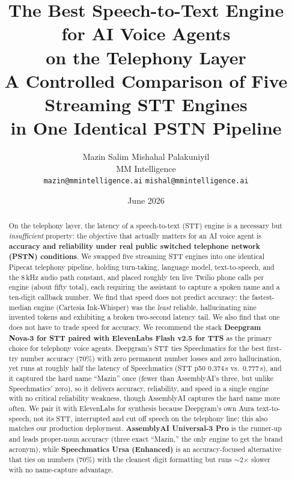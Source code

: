 \documentclass[11pt]{article}
\title{\textbf{The Best Speech-to-Text Engine for AI Voice Agents\\ on the Telephony Layer}\\[0.4em]
\large A Controlled Comparison of Five Streaming STT Engines\\ in One Identical PSTN Pipeline}
\author{%
  Mazin Salim \qquad Mishahal Palakuniyil\\[0.35em]
  \normalsize MM Intelligence\\
  \normalsize \texttt{mazin@mmintelligence.ai} \quad\textbullet\quad \texttt{mishal@mmintelligence.ai}%
}
\date{June 2026}
\begin{document}
\maketitle

\begin{abstract}
\noindent
On the telephony layer, the latency of a speech-to-text (STT) engine is a
necessary but \emph{insufficient} property: the objective that actually matters
for an AI voice agent is \textbf{accuracy and reliability under real public
switched telephone network (PSTN) conditions}. We swapped five streaming STT
engines into one identical Pipecat telephony pipeline, holding turn-taking,
language model, text-to-speech, and the 8\,kHz audio path constant, and placed
roughly ten live Twilio phone calls per engine (about fifty total), each
requiring the assistant to capture a spoken name and a ten-digit callback
number. We find that speed does not predict accuracy: the fastest-median engine
(Cartesia Ink-Whisper) was the \emph{least} reliable, hallucinating nine
invented tokens and exhibiting a broken two-second latency tail. We also find
that one does not have to trade speed for accuracy. We recommend the stack
\textbf{Deepgram Nova-3 for STT paired with ElevenLabs Flash v2.5 for TTS} as
the primary choice for telephony voice agents. Deepgram's STT ties Speechmatics
for the best first-try number accuracy (70\%) with zero permanent number losses
and zero hallucination, yet runs at roughly half the latency of Speechmatics
(STT p50 0.374\,s vs.\ 0.777\,s), and it captured the hard name ``Mazin'' once
(fewer than AssemblyAI's three, but unlike Speechmatics' zero), so it delivers
accuracy, reliability, and speed in a single engine with no critical reliability
weakness, though AssemblyAI captures the hard name more often. We pair it with
ElevenLabs for synthesis because Deepgram's own Aura text-to-speech, not its
STT, interrupted and cut off speech on the telephony line; this also matches our
production deployment. \textbf{AssemblyAI Universal-3 Pro} is the runner-up and
leads proper-noun accuracy (three exact ``Mazin,'' the only engine to get the
brand acronym), while \textbf{Speechmatics Ursa (Enhanced)} is an
accuracy-focused alternative that ties on numbers (70\%) with the cleanest digit
formatting but runs $\sim$2$\times$ slower with no name-capture advantage.
\end{abstract}

\end{document}
